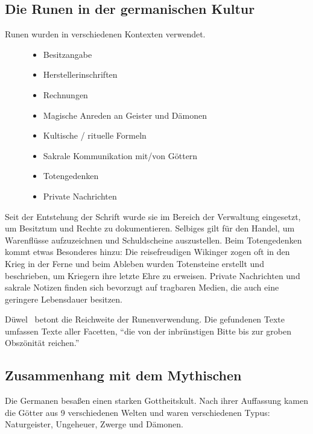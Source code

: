 \documentclass[a4paper]{scrartcl}
\begin{document}
\subsection{Die Runen in der germanischen Kultur}
%
Runen wurden in verschiedenen Kontexten verwendet.

\begin{figure}[!ht]
  \begin{minipage}{0.5\textwidth}
    \begin{itemize}
      \item Besitzangabe
      \item Herstellerinschriften
      \item Rechnungen
      \item Magische Anreden an Geister und Dämonen
    \end{itemize}
  \end{minipage}
  \begin{minipage}{0.5\textwidth}
    \begin{itemize}
      \item Kultische / rituelle Formeln
      \item Sakrale Kommunikation mit/von Göttern
      \item Totengedenken
      \item Private Nachrichten
    \end{itemize}
  \end{minipage}
\end{figure}

Seit der Entstehung der Schrift wurde sie im Bereich der Verwaltung eingesetzt, um Besitztum und Rechte zu dokumentieren. Selbiges gilt für den Handel, um Warenflüsse aufzuzeichnen und Schuldscheine auszustellen. Beim Totengedenken kommt etwas Besonderes hinzu: Die reisefreudigen Wikinger zogen oft in den Krieg in der Ferne und beim Ableben wurden Totensteine erstellt und beschrieben, um Kriegern ihre letzte Ehre zu erweisen. Private Nachrichten und sakrale Notizen finden sich bevorzugt auf tragbaren Medien, die auch eine geringere Lebensdauer besitzen.

Düwel~\cite{düwel} betont die Reichweite der Runenverwendung. Die gefundenen Texte umfassen Texte aller Facetten, \enquote{die von der inbrünstigen Bitte bis zur groben Obszönität reichen.}

\subsection{Zusammenhang mit dem Mythischen}
%
Die Germanen besaßen einen starken Gottheitskult. Nach ihrer Auffassung kamen die Götter aus 9 verschiedenen Welten und waren verschiedenen Typus: Naturgeister, Ungeheuer, Zwerge und Dämonen.
\end{document}
